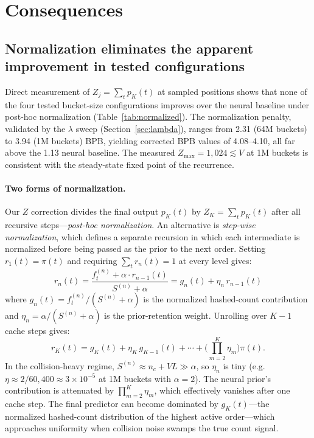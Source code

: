 \documentclass[11pt]{article}
\begin{document}
\section{Consequences}
\label{sec:consequences}

\subsection{Normalization eliminates the apparent improvement in tested configurations}

Direct measurement of $Z_j = \sum_t p_K(t)$ at sampled positions shows that none of the four tested bucket-size configurations improves over the neural baseline under post-hoc normalization (Table~\ref{tab:normalized}). The normalization penalty, validated by the $\lambda$ sweep (Section~\ref{sec:lambda}), ranges from 2.31 (64M buckets) to 3.94 (1M buckets) BPB, yielding corrected BPB values of 4.08--4.10, all far above the 1.13 neural baseline. The measured $Z_{\max} = 1{,}024 \lesssim V$ at 1M buckets is consistent with the steady-state fixed point of the recurrence.

\paragraph{Two forms of normalization.} Our $Z$ correction divides the final output $p_K(t)$ by $Z_K = \sum_t p_K(t)$ after all recursive steps---\emph{post-hoc normalization}. An alternative is \emph{step-wise normalization}, which defines a separate recursion in which each intermediate is normalized before being passed as the prior to the next order. Setting $r_1(t) = \pi(t)$ and requiring $\sum_t r_n(t) = 1$ at every level gives:
\begin{equation}
r_n(t) = \frac{f_t^{(n)} + \alpha \cdot r_{n-1}(t)}{S^{(n)} + \alpha} = g_n(t) + \eta_n \, r_{n-1}(t)
\label{eq:stepwise}
\end{equation}
where $g_n(t) = f_t^{(n)}/(S^{(n)} + \alpha)$ is the normalized hashed-count contribution and $\eta_n = \alpha/(S^{(n)} + \alpha)$ is the prior-retention weight. Unrolling over $K - 1$ cache steps gives:
\[
r_K(t) = g_K(t) + \eta_K \, g_{K-1}(t) + \cdots + \Big(\prod_{m=2}^{K} \eta_m\Big) \pi(t).
\]
In the collision-heavy regime, $S^{(n)} \approx n_c + VL \gg \alpha$, so $\eta_n$ is tiny (e.g.\ $\eta \approx 2/60{,}400 \approx 3 \times 10^{-5}$ at 1M buckets with $\alpha = 2$). The neural prior's contribution is attenuated by $\prod_{m=2}^K \eta_m$, which effectively vanishes after one cache step. The final predictor can become dominated by $g_K(t)$---the normalized hashed-count distribution of the highest active order---which approaches uniformity when collision noise swamps the true count signal.
\end{document}
